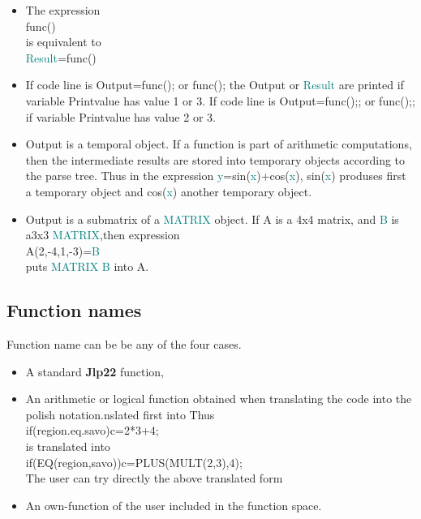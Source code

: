 {\begin{itemize}
\item The expression \\ 
func()\\ 
is equivalent to\\ 
\textcolor{teal}{Result}=func() 
\item If code line is Output=func(); or func(); the Output or \textcolor{teal}{Result} are printed if 
variable Printvalue has value 1 or 3.  If code line is Output=func();; or func();; 
if variable Printvalue has value 2 or 3. 
 
\item Output is a temporal object. If a function is part of arithmetic computations, then 
the intermediate results are stored into temporary objects according to the parse tree. Thus in the 
expression \textcolor{teal}{y}=\textcolor{VioletRed}{sin}(\textcolor{teal}{x})+\textcolor{VioletRed}{cos}(\textcolor{teal}{x}), \textcolor{VioletRed}{sin}(\textcolor{teal}{x}) produses first a temporary object and \textcolor{VioletRed}{cos}(\textcolor{teal}{x}) 
another temporary object. 
\item Output is a submatrix of a \textcolor{teal}{MATRIX} object. If A is a 4x4 matrix, and 
\textcolor{teal}{B} is a3x3 \textcolor{teal}{MATRIX},then expression\\ 
A(2,-4,1,-3)=\textcolor{teal}{B}\\ 
puts \textcolor{teal}{MATRIX} \textcolor{teal}{B} into A. 
\end{itemize} 
\subsection{Function names} 
\label{functionname} 
 
Function name can be be any of the four cases. 
\begin{itemize} 
 
\item A standard \textbf{Jlp22} function, 
\item An arithmetic or logical function obtained when translating the code into the polish notation.nslated first into 
Thus \\ 
\textcolor{VioletRed}{if}(region.eq.savo)c=2*3+4;\\ 
is translated into \\ 
\textcolor{VioletRed}{if}(\textcolor{VioletRed}{EQ}(region,savo))c=\textcolor{VioletRed}{PLUS}(\textcolor{VioletRed}{MULT}(2,3),4);\\ 
The user can try directly the above translated form 
\item An own-function of the user included in the function space. 
 

\end{itemize}}
